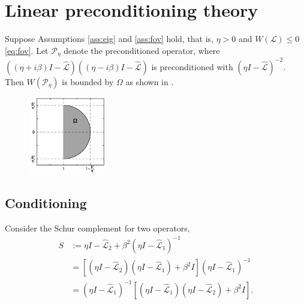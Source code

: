 \documentclass[review]{siamart}
\begin{document}
\section{Linear preconditioning theory}\label{sec:theory}

%
\begin{theorem}\label{th:fov}
Suppose Assumptions \ref{ass:eig} and \ref{ass:fov} hold, that is, $\eta > 0$
and $W(\mathcal{L}) \leq 0$ \eqref{eq:fov}. Let $\mathcal{P}_\eta$ denote the
preconditioned operator, where $((\eta + i\beta)I -
\widehat{\mathcal{L}})((\eta - i\beta)I - \widehat{\mathcal{L}})$ is
preconditioned with $(\eta I - \widehat{\mathcal{L}})^{-2}$. Then 
$W(\mathcal{P}_\eta)$ is bounded by $\Omega$ as shown in .
\begin{figure}[h!]
\centering
\includegraphics[width = 0.3\textwidth]{./figures/fov.pdf}
\caption{}
\label{fig:bound}
\end{figure}
\end{theorem}
%

\subsection{Conditioning}\label{sec:theory:cond}

Consider the Schur complement for two operators,
%
\begin{align}\label{eq:Schur}
S & := \eta I - \widehat{\mathcal{L}}_2 + \beta^2 (\eta I - \widehat{\mathcal{L}}_1)^{-1} \\
& = \left[\left(\eta I - \widehat{\mathcal{L}}_2\right)\left(\eta I - \widehat{\mathcal{L}}_1\right)
	+ \beta^2 I\right]\left(\eta I - \widehat{\mathcal{L}}_1\right)^{-1} \label{eq:Schur1}\\
& = \left(\eta I - \widehat{\mathcal{L}}_1\right)^{-1} \left[\left(\eta I - \widehat{\mathcal{L}}_1\right)
	\left(\eta I - \widehat{\mathcal{L}}_2\right) + \beta^2 I\right]. \label{eq:Schur2}
\end{align}
\end{document}
